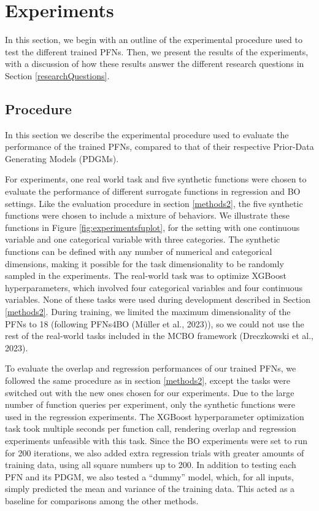 \documentclass[12pt,twoside]{reedthesis}
\begin{document}
\hypertarget{experiments}{%
\chapter{Experiments}\label{experiments}}

In this section, we begin with an outline of the experimental procedure used to test the different trained PFNs. Then, we present the results of the experiments, with a discussion of how these results answer the different research questions in Section \ref{researchQuestions}.

\hypertarget{experimentalProcedure}{%
\section{Procedure}\label{experimentalProcedure}}

In this section we describe the experimental procedure used to evaluate the performance of the trained PFNs, compared to that of their respective Prior-Data Generating Models (PDGMs).

For experiments, one real world task and five synthetic functions were chosen to evaluate the performance of different surrogate functions in regression and BO settings. Like the evaluation procedure in section \ref{methods2}, the five synthetic functions were chosen to include a mixture of behaviors. We illustrate these functions in Figure \ref{fig:experimentsfuplot}, for the setting with one continuous variable and one categorical variable with three categories. The synthetic functions can be defined with any number of numerical and categorical dimensions, making it possible for the task dimensionality to be randomly sampled in the experiments. The real-world task was to optimize XGBoost hyperparameters, which involved four categorical variables and four continuous variables. None of these tasks were used during development described in Section \ref{methods2}. During training, we limited the maximum dimensionality of the PFNs to 18 (following PFNs4BO (Müller et al., 2023)), so we could not use the rest of the real-world tasks included in the MCBO framework (Dreczkowski et al., 2023).

To evaluate the overlap and regression performances of our trained PFNs, we followed the same procedure as in section \ref{methods2}, except the tasks were switched out with the new ones chosen for our experiments. Due to the large number of function queries per experiment, only the synthetic functions were used in the regression experiments. The XGBoost hyperparameter optimization task took multiple seconds per function call, rendering overlap and regression experiments unfeasible with this task. Since the BO experiments were set to run for 200 iterations, we also added extra regression trials with greater amounts of training data, using all square numbers up to 200. In addition to testing each PFN and its PDGM, we also tested a ``dummy'' model, which, for all inputs, simply predicted the mean and variance of the training data. This acted as a baseline for comparisons among the other methods.
\end{document}

